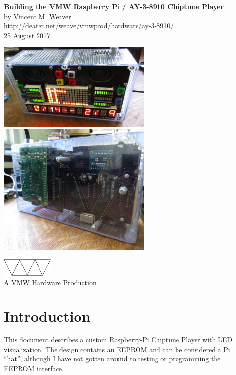 \documentclass[11pt]{article}
\begin{document}
\begin{center}
{\Large \bf Building the VMW Raspberry Pi / AY-3-8910 Chiptune Player}\\[2ex]
by Vincent M. Weaver\\[3ex]
\url{http://deater.net/weave/vmwprod/hardware/ay-3-8910/}\\[3ex]
25 August 2017
\end{center}

\begin{center}
\includegraphics[width=3in]{figs/0377_front_view.jpg}
\includegraphics[width=3in]{figs/0378_back_view.jpg}
\end{center}
\vspace{3ex}
\begin{center}
\includegraphics[width=1in]{figs/vmw}\\
A VMW Hardware Production
\end{center}

\pagebreak

\section{Introduction}

This document describes a custom Raspberry-Pi Chiptune Player with
LED visualization.
The design contains an EEPROM and can be considered a Pi ``hat'', although
I have not gotten around to testing or programming the EEPROM interface.
\end{document}
